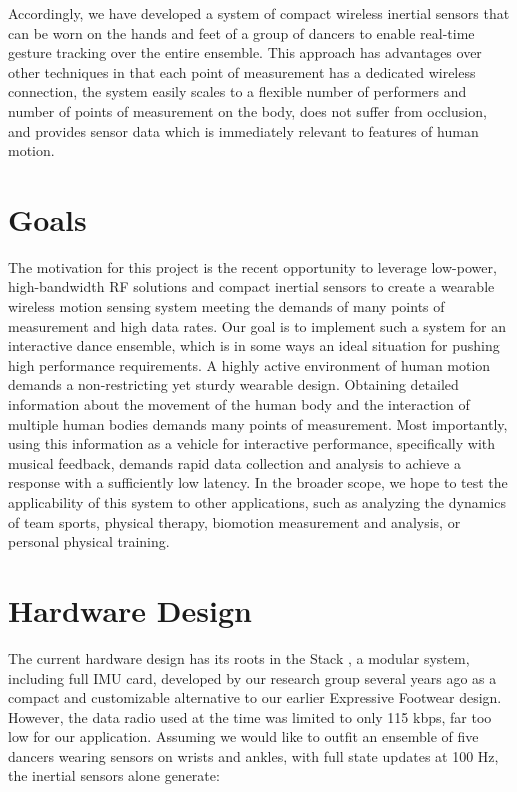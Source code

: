 Accordingly, we have developed a system of compact wireless inertial sensors that can be worn on the hands and feet of a group of dancers to enable real-time gesture tracking over the entire ensemble. This approach has advantages over other techniques in that each point of measurement has a dedicated wireless connection, the system easily scales to a flexible number of performers and number of points of measurement on the body, does not suffer from occlusion, and provides sensor data which is immediately relevant to features of human motion.

\section{Goals}


The motivation for this project is the recent opportunity to leverage low-power, high-bandwidth RF solutions and compact inertial sensors to create a wearable wireless motion sensing system meeting the demands of many points of measurement and high data rates. Our goal is to implement such a system for an interactive dance ensemble, which is in some ways an ideal situation for pushing high performance requirements. A highly active environment of human motion demands a non-restricting yet sturdy wearable design. Obtaining detailed information about the movement of the human body and the interaction of multiple human bodies demands many points of measurement. Most importantly, using this information as a vehicle for interactive performance, specifically with musical feedback, demands rapid data collection and analysis to achieve a response with a sufficiently low latency. In the broader scope, we hope to test the applicability of this system to other applications, such as analyzing the dynamics of team sports, physical therapy, biomotion measurement and analysis, or personal physical training.


\section{Hardware Design}


The current hardware design has its roots in the Stack \cite{Benbasat:2005}, a modular system, including full IMU card, developed by our research group several years ago as a compact and customizable alternative to our earlier Expressive Footwear design. However, the data radio used at the time was limited to only 115 kbps, far too low for our application. Assuming we would like to outfit an ensemble of five dancers wearing sensors on wrists and ankles, with full state updates at 100 Hz, the inertial sensors alone generate:

